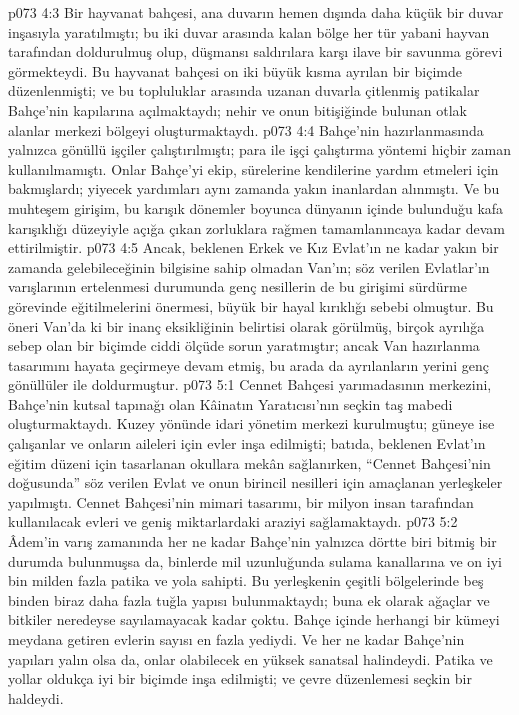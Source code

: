 \vs p073 4:3 Bir hayvanat bahçesi, ana duvarın hemen dışında daha küçük bir duvar inşasıyla yaratılmıştı; bu iki duvar arasında kalan bölge her tür yabani hayvan tarafından doldurulmuş olup, düşmansı saldırılara karşı ilave bir savunma görevi görmekteydi. Bu hayvanat bahçesi on iki büyük kısma ayrılan bir biçimde düzenlenmişti; ve bu topluluklar arasında uzanan duvarla çitlenmiş patikalar Bahçe’nin kapılarına açılmaktaydı; nehir ve onun bitişiğinde bulunan otlak alanlar merkezi bölgeyi oluşturmaktaydı.
\vs p073 4:4 Bahçe’nin hazırlanmasında yalnızca gönüllü işçiler çalıştırılmıştı; para ile işçi çalıştırma yöntemi hiçbir zaman kullanılmamıştı. Onlar Bahçe’yi ekip, sürelerine kendilerine yardım etmeleri için bakmışlardı; yiyecek yardımları aynı zamanda yakın inanlardan alınmıştı. Ve bu muhteşem girişim, bu karışık dönemler boyunca dünyanın içinde bulunduğu kafa karışıklığı düzeyiyle açığa çıkan zorluklara rağmen tamamlanıncaya kadar devam ettirilmiştir.
\vs p073 4:5 Ancak, beklenen Erkek ve Kız Evlat’ın ne kadar yakın bir zamanda gelebileceğinin bilgisine sahip olmadan Van’ın; söz verilen Evlatlar’ın varışlarının ertelenmesi durumunda genç nesillerin de bu girişimi sürdürme görevinde eğitilmelerini önermesi, büyük bir hayal kırıklığı sebebi olmuştur. Bu öneri Van’da ki bir inanç eksikliğinin belirtisi olarak görülmüş, birçok ayrılığa sebep olan bir biçimde ciddi ölçüde sorun yaratmıştır; ancak Van hazırlanma tasarımını hayata geçirmeye devam etmiş, bu arada da ayrılanların yerini genç gönüllüler ile doldurmuştur.
\vs p073 5:1 Cennet Bahçesi yarımadasının merkezini, Bahçe’nin kutsal tapınağı olan Kâinatın Yaratıcısı’nın seçkin taş mabedi oluşturmaktaydı. Kuzey yönünde idari yönetim merkezi kurulmuştu; güneye ise çalışanlar ve onların aileleri için evler inşa edilmişti; batıda, beklenen Evlat’ın eğitim düzeni için tasarlanan okullara mekân sağlanırken, “Cennet Bahçesi’nin doğusunda” söz verilen Evlat ve onun birincil nesilleri için amaçlanan yerleşkeler yapılmıştı. Cennet Bahçesi’nin mimari tasarımı, bir milyon insan tarafından kullanılacak evleri ve geniş miktarlardaki araziyi sağlamaktaydı.
\vs p073 5:2 Âdem’in varış zamanında her ne kadar Bahçe’nin yalnızca dörtte biri bitmiş bir durumda bulunmuşsa da, binlerde mil uzunluğunda sulama kanallarına ve on iyi bin milden fazla patika ve yola sahipti. Bu yerleşkenin çeşitli bölgelerinde beş binden biraz daha fazla tuğla yapısı bulunmaktaydı; buna ek olarak ağaçlar ve bitkiler neredeyse sayılamayacak kadar çoktu. Bahçe içinde herhangi bir kümeyi meydana getiren evlerin sayısı en fazla yediydi. Ve her ne kadar Bahçe’nin yapıları yalın olsa da, onlar olabilecek en yüksek sanatsal halindeydi. Patika ve yollar oldukça iyi bir biçimde inşa edilmişti; ve çevre düzenlemesi seçkin bir haldeydi.
